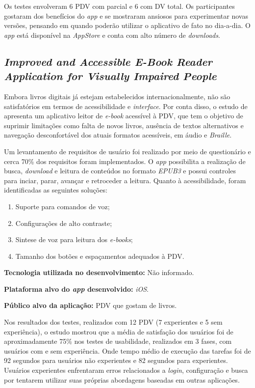 Os testes envolveram 6 PDV com parcial e 6 com DV total.
Os participantes gostaram dos benefícios do \emph{app} e se mostraram ansiosos para experimentar novas versões, pensando em quando poderão utilizar o aplicativo de fato no dia-a-dia.
O \emph{app} está disponível na \emph{AppStore} e conta com alto número de \emph{downloads}.

\subsection{\emph{Improved and Accessible E-Book Reader Application for Visually Impaired People}}

Embora livros digitais já estejam estabelecidos internacionalmente, não são satisfatórios em termos de acessibilidade e \emph{interface}.
Por conta disso, o estudo de  apresenta um aplicativo leitor de \emph{e-book} acessível à PDV, que tem o objetivo de suprimir limitações como falta de novos livros, ausência de textos alternativos e navegação desconfortável dos atuais formatos acessíveis, em áudio e \emph{Braille}.

Um levantamento de requisitos de usuário foi realizado por meio de questionário e cerca 70\% dos requisitos foram implementados.
O \emph{app} possibilita a realização de busca, \emph{download} e leitura de conteúdos no formato \emph{EPUB3} e possui controles para inciar, parar, avançar e retroceder a leitura.
Quanto à acessibilidade, foram identificadas as seguintes soluções:

\begin{enumerate}
    \item Suporte para comandos de voz;
    \item Configurações de alto contraste;
    \item Sintese de voz para leitura dos \emph{e-books};
    \item Tamanho dos botões e espaçamentos adequados à PDV\@.
\end{enumerate}

\textbf{Tecnologia utilizada no desenvolvimento:} Não informado.

\textbf{Plataforma alvo do \emph{app} desenvolvido:} \emph{iOS}.

\textbf{Público alvo da aplicação:} PDV que gostam de livros\@.

Nos resultados dos testes, realizados com 12 PDV (7 experientes e 5 sem experiência), o estudo mostrou que a média de satisfação dos usuários foi de aproximadamente 75\% nos testes de usabilidade, realizados em 3 fases, com usuários com e sem experiência.
Onde tempo médio de execução das tarefas foi de 92 segundos para usuários não experientes e 82 segundos para experientes.
Usuários experientes enfrentaram erros relacionados a \emph{login}, configuração e busca por tentarem utilizar suas próprias abordagens baseadas em outras aplicações.

